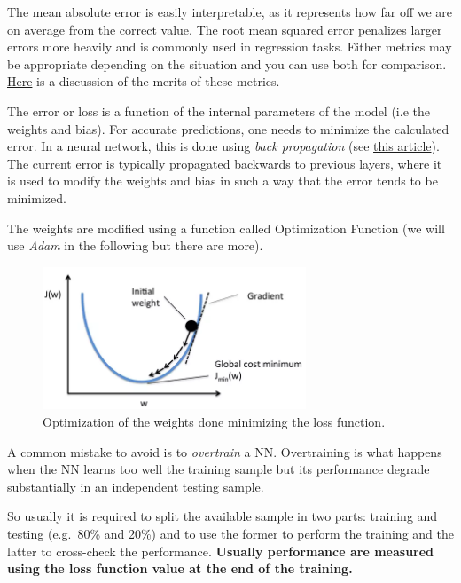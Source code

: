 The mean absolute error is easily interpretable, as it represents how
far off we are on average from the correct value. The root mean squared
error penalizes larger errors more heavily and is commonly used in
regression tasks. Either metrics may be appropriate depending on the
situation and you can use both for comparison.
\href{https://medium.com/human-in-a-machine-world/mae-and-rmse-which-metric-is-better-e60ac3bde13d}{Here}
is a discussion of the merits of these metrics.

The error or loss is a function of the internal parameters of the model
(i.e the weights and bias). For accurate predictions, one needs to
minimize the calculated error. In a neural network, this is done using
\emph{back propagation} (see
\href{https://towardsdatascience.com/understanding-backpropagation-algorithm-7bb3aa2f95fd}{this article}). The current error is typically propagated backwards to previous layers, where it is used to modify the weights and bias in such
a way that the error tends to be minimized.

The weights are modified using a function called Optimization Function
(we will use \emph{Adam} in the following but there are
more).

\begin{figure}[htb]
	\centering
	\includegraphics[width=0.7\textwidth]{figures/loss_function}
	\caption{Optimization of the weights done minimizing the loss function.}
\end{figure}

A common mistake to avoid is to \emph{overtrain} a NN. Overtraining is
what happens when the NN learns too well the training sample but its
performance degrade substantially in an independent testing sample.

So usually it is required to split the available sample in two parts:
training and testing (e.g.~80\% and 20\%) and to use the former to
perform the training and the latter to cross-check the performance.
\textbf{Usually performance are measured using the loss function value
	at the end of the training.}

